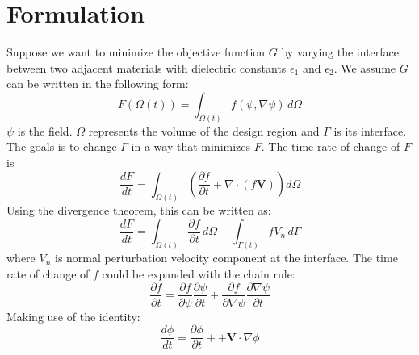 \documentclass{tufte-handout}
\begin{document}
\section{Formulation}
Suppose we want to minimize the objective function $G$ by varying the interface between two adjacent materials with dielectric constants $\epsilon_1$ and $\epsilon_2$. We assume  $G$ can be written in the following form:
\begin{equation}
F(\Omega(t)) = \int_{\Omega(t)} f(\psi,\nabla \psi) \, d\Omega
\end{equation} 
$\psi$ is the field. $\Omega$ represents the volume of the design region and $\Gamma$ is its interface. The goals is to change $\Gamma$  in a way that minimizes $F$. 
The time rate of change of $F$ is
\begin{equation}
\frac{d F}{d t} = \int_{\Omega(t)} \left( \frac{\partial f}{\partial t} + \nabla \cdot (f \boldsymbol{V})  \right) d\Omega
\end{equation}
Using the divergence theorem, this can be written as:
\begin{equation}
\frac{d F}{d t} =  \int_{\Omega(t)} \frac{\partial f}{\partial t} \,  d\Omega + \int_{\Gamma(t)}  f V_n \,  d\Gamma
\end{equation}
where $V_n$ is normal perturbation velocity component at the interface. The time rate of change of $f$ could be expanded with the chain rule:
\begin{equation}
 \frac{\partial f}{\partial t} =  \frac{\partial f}{\partial \psi}   \frac{\partial \psi}{\partial t}+  \frac{\partial f}{\partial \nabla \psi}   \frac{\partial \nabla \psi}{\partial t}
\end{equation}
Making use of the identity: 
\begin{equation}
\frac{d \phi}{d t} = \frac{\partial \phi}{\partial t}+ 
+ \boldsymbol{V}  \cdot \nabla \phi
\end{equation}
\end{document}
